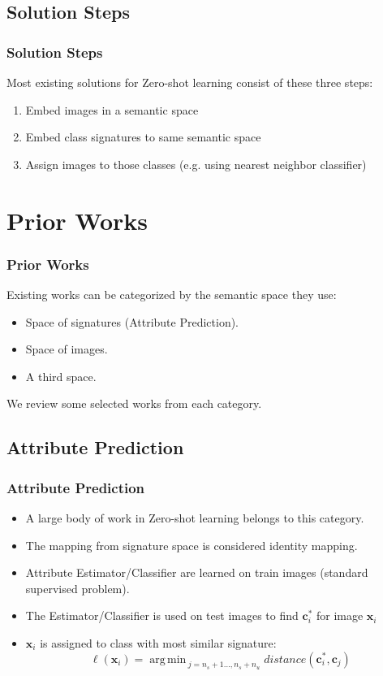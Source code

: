\documentclass{beamer}
\DeclareMathOperator*{\argmin}{arg\,min\,}
\begin{document}
\subsection{Solution Steps}
\label{sub:Solution Steps}

\begin{frame}\frametitle{Solution Steps}
Most existing solutions for Zero-shot learning consist of these three steps:
\begin{enumerate}
\item Embed images in a semantic space \pause
\item Embed class signatures to same semantic space \pause
\item Assign images to those classes (e.g. using nearest neighbor classifier)
\end{enumerate}
\end{frame}
\section{Prior Works}
\label{sec:Prior Works}
\begin{frame}\frametitle{Prior Works}
  Existing works can be categorized by the semantic space they use:
  \begin{itemize}
    \item Space of signatures (Attribute Prediction).
    \item Space of images.
    \item A third space.
  \end{itemize}
  We review some selected works from each category.
\end{frame}

\subsection{Attribute Prediction}
\begin{frame}\frametitle{Attribute Prediction}
  \begin{itemize}
    \item A large body of work in Zero-shot learning belongs to this category.
    \item The mapping from signature space is considered identity mapping.
    \item Attribute Estimator/Classifier are learned on train images (standard supervised problem).
    \item The Estimator/Classifier is used on test images to find $\mathbf{c}^{\ast}_i$ for image $\mathbf{x}_i$
    \item $\mathbf{x}_i$ is assigned to class with most similar signature:
    $$ \ell(\mathbf{x}_i) = \argmin_{j=n_s+1 \ldots, n_s + n_u} distance(\mathbf{c}^{\ast}_i, \mathbf{c}_j) $$
  \end{itemize}
\end{frame}
\end{document}

